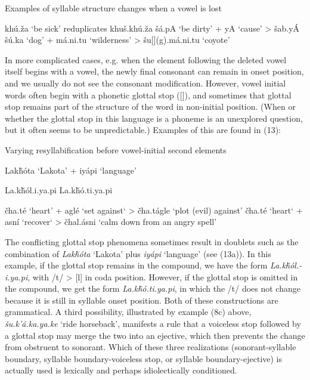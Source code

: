 \documentclass[output=paper]{LSP/langsci}
\begin{document}
\begin{exe}
\ex Examples of syllable structure changes when a vowel is lost
\begin{xlist}
\ex kh\'u.\v{z}a `be sick' reduplicates khu\v{s}.kh\'u.\v{z}a
\ex \v{s}\'a.pA `be dirty' + yA `cause' > \v{s}ab.y\'A
\ex \v{s}\'u.ka `dog' + m\'a.ni.tu `wilderness' > \v{s}u[](g).m\'a.ni.tu `coyote'
\end{xlist}
\end{exe}

In more complicated cases, e.g. when the element following the deleted vowel itself begins with a vowel, the newly final consonant can remain in onset position, and we usually do not see the consonant modification. However, vowel initial words often begin with a phonetic glottal stop ([]), and sometimes that glottal stop remains part of the structure of the word in non-initial position. (When or whether the glottal stop in this language is a phoneme is an unexplored question, but it often seems to be unpredictable.) Examples of this are found in (13):

\begin{exe}
\ex Varying resyllabification before vowel-initial second elements
\begin{xlist}
\ex Lak\v{h}\'ota `Lakota' + iy\'api `language'
\begin{xlist}
\ex La.k\v{h}\'ol.i.ya.pi
\ex La.k\v{h}\'o.ti.ya.pi
\end{xlist}
\ex 
\begin{xlist}
\ex \v{c}ha.t\'e `heart' + agl\'e `set against` > \v{c}ha.t\'agle `plot (evil) against'
\ex \v{c}ha.t\'e `heart` + asn\'i `recover` > \v{c}hal.\'asni `calm down from an angry spell'
\end{xlist}
\end{xlist}
\end{exe}

The conflicting glottal stop phenomena sometimes result in doublets such as the combination of \textit{Lak\v{h}\'ota} `Lakota' plus \textit{iy\'api} `language' (see (13a)). In this example, if the glottal stop remains in the compound, we have the form \textit{La.k\v{h}\'ol.- i.ya.pi}, with /t/ > [l] in coda position. However, if the glottal stop is omitted in the compound, we get the form \textit{La.k\v{h}\'o.ti.ya.pi}, in which the /t/ does not change because it is still in syllable onset position. Both of these constructions are grammatical. A third possibility, illustrated by example (8c) above, \textit{\v{s}u.k'\'a.ka.ya.ke} `ride horseback', manifests a rule that a voiceless stop followed by a glottal stop may merge the two into an ejective, which then prevents the change from obstruent to sonorant. Which of these three realizations (sonorant-syllable boundary, syllable boundary-voiceless stop, or syllable boundary-ejective) is actually used is lexically and perhaps idiolectically conditioned.
\end{document}
